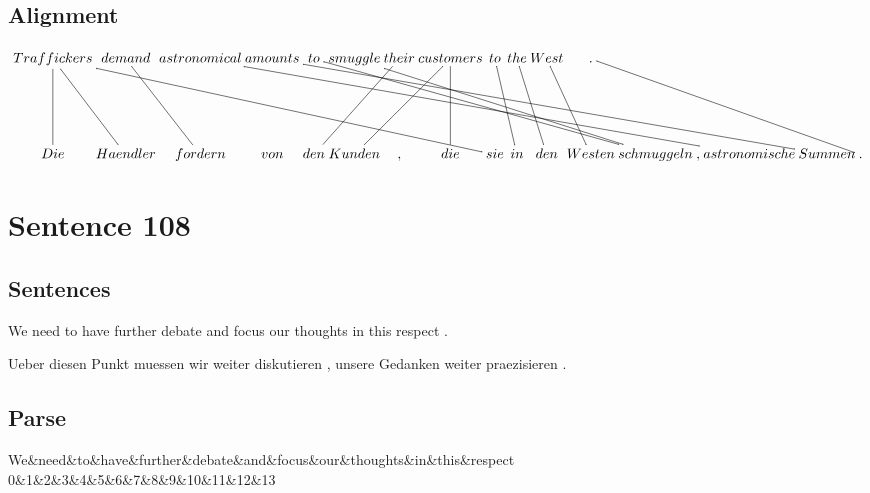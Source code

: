 \documentclass{report}
\begin{document}
\subsection*{Alignment}
\scriptsize{
$
\xymatrix@C-2.3pc{
Traffickers \ar @{-} [ddr] \ar @{-} [ddrrrrrrrr] \ar @{-} [dd] & demand \ar @{-} [ddr] & astronomical \ar @{-} [ddrrrrrrrrrrrr] & amounts \ar @{-} [ddrrrrrrrrrrrr] & to \ar @{-} [ddrrrrrrrr] & smuggle \ar @{-} [ddrrrrrrr] & their \ar @{-} [ddll] & customers \ar @{-} [ddll] \ar @{-} [dd] & to \ar @{-} [ddr] & the \ar @{-} [ddr] & West \ar @{-} [ddr] & . \ar @{-} [ddrrrrr]\\\\
Die & Haendler & fordern & von & den & Kunden & , & die & sie & in & den & Westen & schmuggeln & , & astronomische & Summen & .
}$}
\newpage\section*{Sentence 108}

\subsection*{Sentences}
We need to have further debate and focus our thoughts in this respect .

\noindent Ueber diesen Punkt muessen wir weiter diskutieren , unsere Gedanken weiter praezisieren .



\subsection*{Parse}
\begin{dependency}[theme=simple]
\begin{deptext}[column sep=.5cm, row sep=.1ex]
We\&need\&to\&have\&further\&debate\&and\&focus\&our\&thoughts\&in\&this\&respect\\
0\&1\&2\&3\&4\&5\&6\&7\&8\&9\&10\&11\&12\&13\\
\end{deptext}
\end{dependency}
\end{document}
